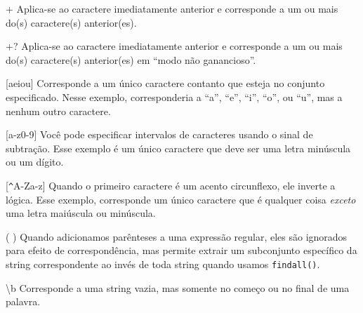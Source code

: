 + \newline
Aplica-se ao caractere imediatamente anterior e corresponde a um ou mais do(s) caractere(s) 
anterior(es).

+? \newline
Aplica-se ao caractere imediatamente anterior e corresponde a um ou mais do(s) caractere(s)
anterior(es) em ``modo não ganancioso''.

[aeiou] \newline
Corresponde a um único caractere contanto que esteja no conjunto especificado. Nesse exemplo, 
corresponderia a  ``a'', ``e'', ``i'', ``o'', ou ``u'', mas a nenhum outro caractere.

[a-z0-9] \newline
Você pode especificar intervalos de caracteres usando o sinal de subtração. Esse exemplo é um 
único caractere que deve ser uma letra minúscula ou um dígito.

[\verb"^"A-Za-z] \newline
Quando o primeiro caractere é um acento circunflexo, ele inverte a lógica. Esse exemplo, 
corresponde um único caractere que é qualquer coisa {\em exceto} uma letra maiúscula ou minúscula.

( ) \newline
Quando adicionamos parênteses a uma expressão regular, eles são ignorados para efeito de 
correspondência, mas permite extrair um subconjunto específico da string correspondente ao invés 
de toda string quando usamos {\tt findall()}.

{\textbackslash}b \newline
Corresponde a uma string vazia, mas somente no começo ou no final de uma palavra.

